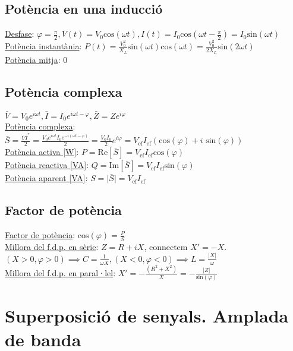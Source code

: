 \documentclass[12pt]{article}
\begin{document}
\begin{multicols}{5}
\subsection{Potència en una inducció}

\underline{Desfase}: $\varphi = \frac{\pi}{2}, V(t) = V_0\text{cos}(\omega t), I(t) = I_0\text{cos}(\omega t - \frac{\pi}{2}) = I_0\text{sin}(\omega t)$ \\
\underline{Potència instantània}: $P(t) = \frac{V_0^2}{X_L}\text{sin}(\omega t)\text{cos}(\omega t) = \frac{V_0^2}{2X_L}\text{sin}(2\omega t)$ \\
\underline{Potència mitja}: 0

\subsection{Potència complexa}

$\bar{V} = V_0e^{i\omega t}, \bar{I} = I_0e^{i\omega t - \varphi}, \bar{Z} = Z e^{i\varphi}$ \\
\underline{Potència complexa}: $\bar{S} = \frac{\bar{V}\bar{I}^*}{2} = \frac{V_0e^{i\omega t}I_0e^{-i(\omega t - \varphi)}}{2} = \frac{V_0I_0}{2}e^{i\varphi} = V_{\text{ef}}I_{\text{ef}}(\text{cos}(\varphi) + i\text{ sin}(\varphi))$ \\
\underline{Potència activa [W]}: $P = \text{Re}[\bar{S}] = V_{\text{ef}}I_{\text{ef}}\text{cos}(\varphi)$ \\
\underline{Potència reactiva [VA]}: $Q = \text{Im}[\bar{S}] = V_{\text{ef}}I_{\text{ef}}\text{sin}(\varphi)$ \\
\underline{Potència aparent [VA]}: $S = \vert \bar{S} \vert = V_{\text{ef}}I_{\text{ef}}$

\subsection{Factor de potència}

\underline{Factor de potència}: $\text{cos}(\varphi) = \frac{P}{S}$ \\
\underline{Millora del f.d.p. en sèrie}: $Z = R + iX$, connectem $X' = -X$. $(X>0,\varphi>0) \implies C=\frac{1}{\omega X}, (X<0, \varphi<0) \implies L=\frac{\vert X\vert}{\omega}$ \\
\underline{Millora del f.d.p. en paral·lel}: $X' = -\frac{(R^2+X^2)}{X} = -\frac{\vert Z\vert}{\text{sin}(\varphi)}$

\section{Superposició de senyals. Amplada de banda}


\end{multicols}
\end{document}
